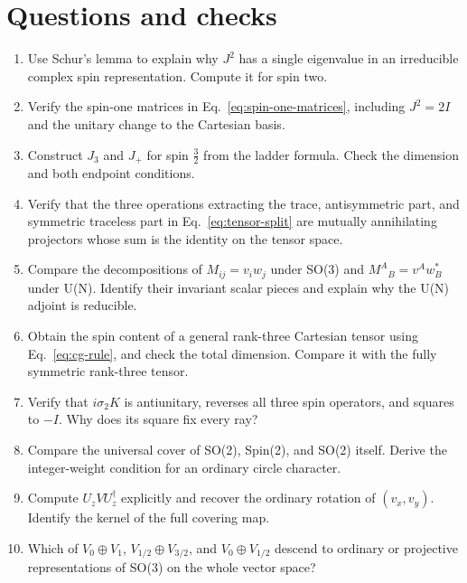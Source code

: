 \documentclass[11pt]{article}
\begin{document}
\section*{Questions and checks}
\begin{enumerate}
\item Use Schur's lemma to explain why \(J^2\) has a single eigenvalue
in an irreducible complex spin representation. Compute it for spin two.
\item Verify the spin-one matrices in Eq.~\eqref{eq:spin-one-matrices},
including \(J^2=2I\) and the unitary change to the Cartesian basis.
\item Construct \(J_3\) and \(J_+\) for spin \(\tfrac32\) from the ladder
formula. Check the dimension and both endpoint conditions.
\item Verify that the three operations extracting the trace,
antisymmetric part, and symmetric traceless part in
Eq.~\eqref{eq:tensor-split} are mutually annihilating projectors whose
sum is the identity on the tensor space.
\item Compare the decompositions of \(M_{ij}=v_iw_j\) under SO(3) and
\(M^A{}_B=v^Aw_B^*\) under U(N). Identify their invariant scalar pieces
and explain why the U(N) adjoint is reducible.
\item Obtain the spin content of a general rank-three Cartesian tensor
using Eq.~\eqref{eq:cg-rule}, and check the total dimension. Compare it
with the fully symmetric rank-three tensor.
\item Verify that \(i\sigma_2K\) is antiunitary, reverses all three spin
operators, and squares to \(-I\). Why does its square fix every ray?
\item Compare the universal cover of SO(2), Spin(2), and SO(2) itself.
Derive the integer-weight condition for an ordinary circle character.
\item Compute \(U_zVU_z^\dagger\) explicitly and recover the ordinary
rotation of \((v_x,v_y)\). Identify the kernel of the full covering map.
\item Which of \(V_0\oplus V_1\), \(V_{1/2}\oplus V_{3/2}\), and
\(V_0\oplus V_{1/2}\) descend to ordinary or projective representations
of SO(3) on the whole vector space?
\end{enumerate}

\clearpage
\end{document}
